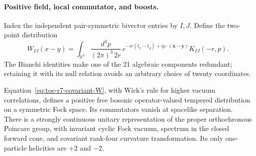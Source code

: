 \paragraph{Positive field, local commutator, and boosts.}
Index the independent pair-symmetric bivector entries by $I,J$.
Define the two-point distribution
\begin{equation}
 W_{IJ}(x-y)=\int_{\mathbb R^3}
 \frac{d^3p}{(2\pi)^3\,2r}\,
 e^{-ir(t_x-t_y)+ip\cdot(\mathbf x-\mathbf y)}K_{IJ}(-r,p).
 \label{eq:toe-r7-covariant-W}
\end{equation}
The Bianchi identities make one of the 21 algebraic components redundant;
retaining it with its null relation avoids an arbitrary choice of twenty
coordinates.

\begin{theorem}
Equation~\eqref{eq:toe-r7-covariant-W}, with Wick's rule for higher vacuum correlations,
defines a positive free bosonic operator-valued tempered distribution on
a symmetric Fock space. Its commutators vanish at spacelike separation.
There is a strongly continuous unitary representation of the proper
orthochronous Poincare group, with invariant cyclic Fock vacuum, spectrum
in the closed forward cone, and covariant rank-four curvature transformation.
Its only one-particle helicities are $+2$ and $-2$.
\end{theorem}
